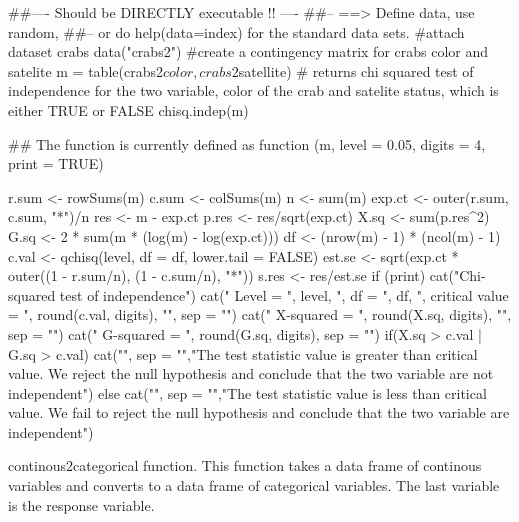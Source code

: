 \documentclass[letterpaper]{book}
\begin{document}
\begin{Examples}
\begin{ExampleCode}
##---- Should be DIRECTLY executable !! ----
##-- ==>  Define data, use random,
##--	or do  help(data=index)  for the standard data sets.
#attach dataset crabs
  data("crabs2")
  #create a contingency matrix for crabs color and satelite 
  m = table(crabs2$color, crabs2$satellite)
  # returns chi squared test of independence for the two variable, color of the crab and satelite status, which is either TRUE or FALSE 
  chisq.indep(m)
  
  
  
## The function is currently defined as
function (m, level = 0.05, digits = 4, print = TRUE) 
{
    r.sum <- rowSums(m)
    c.sum <- colSums(m)
    n <- sum(m)
    exp.ct <- outer(r.sum, c.sum, "*")/n
    res <- m - exp.ct
    p.res <- res/sqrt(exp.ct)
    X.sq <- sum(p.res^2)
    G.sq <- 2 * sum(m * (log(m) - log(exp.ct)))
    df <- (nrow(m) - 1) * (ncol(m) - 1)
    c.val <- qchisq(level, df = df, lower.tail = FALSE)
    est.se <- sqrt(exp.ct * outer((1 - r.sum/n), (1 - c.sum/n), 
        "*"))
    s.res <- res/est.se
    if (print) {
        cat("Chi-squared test of independence\n")
        cat("  Level = ", level, ", df = ", df, ", critical value = ", 
            round(c.val, digits), "\n", sep = "")
        cat("  X-squared = ", round(X.sq, digits), "\n", sep = "")
        cat("  G-squared = ", round(G.sq, digits), sep = "")
      if(X.sq > c.val | G.sq > c.val){
      cat("\n", sep = "","The test statistic value is greater than critical value. We reject the null hypothesis and conclude that the two variable are not independent")
    } else {
      cat("\n", sep = "","The test statistic value is less than critical value. We fail to reject the null hypothesis and conclude that the two variable are independent")
    }
    }
    
  }
\end{ExampleCode}
\end{Examples}
%
\begin{Description}\relax

continous2categorical function. This function takes a data frame of continous variables and converts to a data frame of categorical variables. The last variable is the response variable.

\end{Description}
\end{document}
